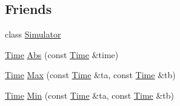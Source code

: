 \subsection*{Friends}
\begin{DoxyCompactItemize}
\item 
class \hyperlink{classns3_1_1Time_a4ba4278eee9a6776d60f4aa6b42c3a76}{Simulator}
\item 
\hyperlink{classns3_1_1Time}{Time} \hyperlink{classns3_1_1Time_aed2cddd6d937034dbd278aa498ba129e}{Abs} (const \hyperlink{classns3_1_1Time}{Time} \&time)
\item 
\hyperlink{classns3_1_1Time}{Time} \hyperlink{classns3_1_1Time_a5669b6192fea38976330e88b78ee0193}{Max} (const \hyperlink{classns3_1_1Time}{Time} \&ta, const \hyperlink{classns3_1_1Time}{Time} \&tb)
\item 
\hyperlink{classns3_1_1Time}{Time} \hyperlink{classns3_1_1Time_a17973c48c37cbc94af051020862ec04b}{Min} (const \hyperlink{classns3_1_1Time}{Time} \&ta, const \hyperlink{classns3_1_1Time}{Time} \&tb)
\end{DoxyCompactItemize}
{\bf }\par
